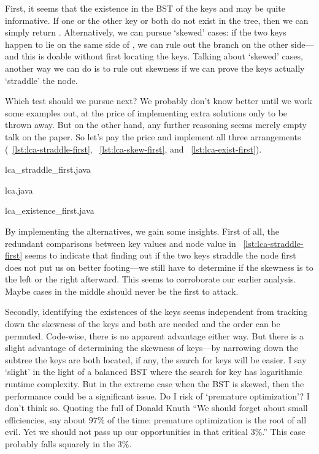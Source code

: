 First, it seems that the existence in the BST of the keys  and  may be
quite informative.
If one or the other key or both do not exist in the tree, then we can simply return .
Alternatively, we can pursue `skewed' cases: if the two keys happen to lie on the same side of
, we can rule out the branch on the other side---and this is doable
without first locating the keys.
Talking about `skewed' cases, another way we can do is to rule out skewness if we can prove the keys
actually `straddle' the  node.


Which test should we pursue next?
We probably don't know better until we work some examples out, at the price of implementing extra
solutions only to be thrown away.
But on the other hand, any further reasoning seems merely empty talk on the paper.
So let's pay the price and implement all three arrangements (~\autoref{lst:lca-straddle-first},
~\ref{lst:lca-skew-first}, and ~\ref{lst:lca-exist-first}).
\begin{clisting}
    
    {lca_straddle_first.java}
    
    {lca.java}
    
    {lca_existence_first.java}
\end{clisting}

By implementing the alternatives, we gain some insights.
First of all, the redundant comparisons between key values and  node value in
~\autoref{lst:lca-straddle-first} seems to indicate that
finding out if the two keys straddle the  node first does not put us
on better footing---we still have to determine if the skewness is to the left or the right
afterward.
This seems to corroborate our earlier analysis.
Maybe cases in the middle should never be the first to attack.

Secondly, identifying the existences of the keys seems independent from tracking down the
skewness of the keys and both are needed and the order can be permuted.
Code-wise, there is no apparent advantage either way.
But there is a slight advantage of determining the skewness of keys---by narrowing down the
subtree the keys are both located, if any, the search for keys will be easier.
I say `slight' in the light of a balanced BST where the search for key has logarithmic runtime
complexity.
But in the extreme case when the BST is skewed, then the performance could be a significant issue.
Do I risk of `premature optimization'?
I don't think so.
Quoting the full of Donald Knuth ``We should forget about small efficiencies,
say about $97\%$ of the time: premature optimization is the root of all evil.
Yet we should not pass up our opportunities in that critical $3\%$.''
This case probably falls squarely in the $3\%$.

